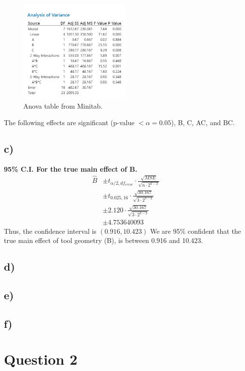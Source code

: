 \documentclass{article}
\begin{document}
\begin{figure}[h]
    \centering
    \includegraphics[width=0.5\textwidth]{./images/1_b.png}
    \caption{Anova table from Minitab.}
    \label{fig:3_b_2}
\end{figure}

The following effects are significant (p-value $< \alpha = 0.05$), B, C, AC, and BC.

\subsection*{c)}
\textbf{95\% C.I. For the true main effect of B.} \\
\begin{align*}
    \hat{B} &\pm t_{\alpha/2, df_{error}} \cdot \frac{\sqrt{MSE}}{\sqrt{n \cdot 2^{k-2}}} \\
            &\pm t_{0.025, 16} \cdot \frac{\sqrt{30.167}}{\sqrt{3 \cdot 2^{3-2}}} \\
            &\pm 2.120 \cdot \frac{\sqrt{30.167}}{\sqrt{3 \cdot 2^{3-2}}} \\
            &\pm 4.753640093
\end{align*}
Thus, the confidence interval is $(0.916, 10.423)$
We are 95\% confident that the true main effect of tool geometry (B), is between 0.916 and 10.423.
\subsection*{d)}
\subsection*{e)}
\subsection*{f)}


\section*{Question 2}
\end{document}
